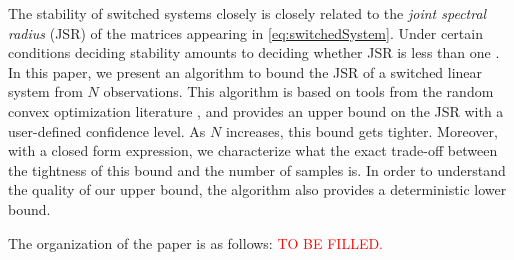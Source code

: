 The stability of switched systems closely is closely related to the \emph{joint spectral radius} (JSR) of the matrices appearing in \eqref{eq:switchedSystem}. Under certain conditions deciding stability amounts to deciding whether JSR is less than one \cite{jungersBook}. In this paper, we present an algorithm to bound the JSR of a switched linear system from $N$ observations. This algorithm is based on tools from the random convex optimization literature \cite{campi}, and provides an upper bound on the JSR with a user-defined confidence level. As $N$ increases, this bound gets tighter. Moreover, with a closed form expression, we characterize what the exact trade-off between the tightness of this bound and the number of samples is. In order to understand the quality of our upper bound, the algorithm also provides a deterministic lower bound.

The organization of the paper is as follows: \textcolor{red}{TO BE FILLED.}





